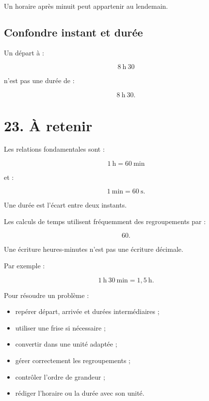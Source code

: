 Un horaire après minuit peut appartenir au lendemain.

\subsection{Confondre instant et durée}

Un départ à :

\[
8\ \text{h}\ 30
\]

n’est pas une durée de :

\[
8\ \text{h}\ 30.
\]

\section{23. À retenir}

Les relations fondamentales sont :

\[
\boxed{
1\ \text{h}=60\ \text{min}
}
\]

et :

\[
\boxed{
1\ \text{min}=60\ \text{s}
}.
\]

Une durée est l’écart entre deux instants.

Les calculs de temps utilisent fréquemment des regroupements par :

\[
60.
\]

Une écriture heures-minutes n’est pas une écriture décimale.

Par exemple :

\[
\boxed{
1\ \text{h}\ 30\ \text{min}=1{,}5\ \text{h}
}.
\]

Pour résoudre un problème :

\begin{itemize}
\item repérer départ, arrivée et durées intermédiaires ;
\item utiliser une frise si nécessaire ;
\item convertir dans une unité adaptée ;
\item gérer correctement les regroupements ;
\item contrôler l’ordre de grandeur ;
\item rédiger l’horaire ou la durée avec son unité.
\end{itemize}
